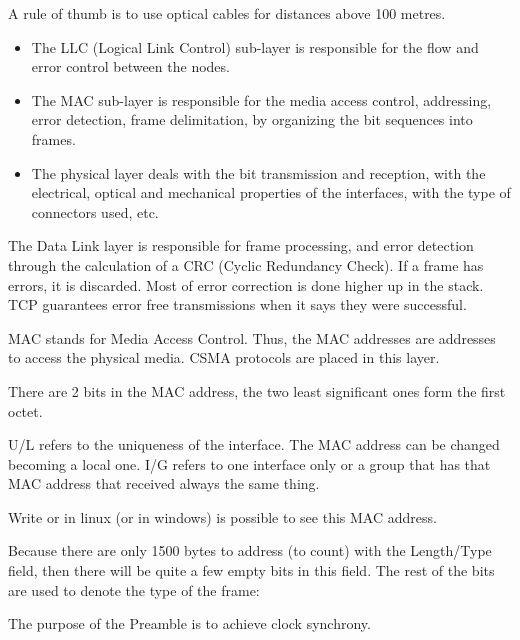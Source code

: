 A rule of thumb is to use optical cables for distances above 100 metres.


\begin{itemize}
    \item The LLC (Logical Link Control) sub-layer is responsible
    for the flow and error control between the nodes.
    \item The MAC sub-layer is responsible for the media
    access control, addressing, error detection, frame
    delimitation, by organizing the bit sequences into
    frames.
    \item The physical layer deals with the bit transmission
    and reception, with the electrical, optical and
    mechanical properties of the interfaces, with the type
    of connectors used, etc.
\end{itemize}


The Data Link layer is responsible for frame processing, and error detection through the calculation of a CRC (Cyclic Redundancy Check). If a frame has errors, it is discarded.
Most of error correction is done higher up in the stack. TCP guarantees error free transmissions when it says they were successful.

MAC stands for Media Access Control. Thus, the MAC addresses are addresses to access the physical media. CSMA protocols are placed in this layer. 

There are 2 bits in the MAC address, the two least significant ones form the first octet.


U/L refers to the uniqueness of the interface. The MAC address can be changed becoming a local one. I/G refers to one interface only or a group that has that MAC address that received always the same thing. 

Write  or  in linux (or  in windows) is possible to see this MAC address.




Because there are only 1500 bytes to address (to count) with the Length/Type field, then there will be quite a few empty bits in this field. The rest of the bits are used to denote the type of the frame: 




The purpose of the Preamble is to achieve clock synchrony.





